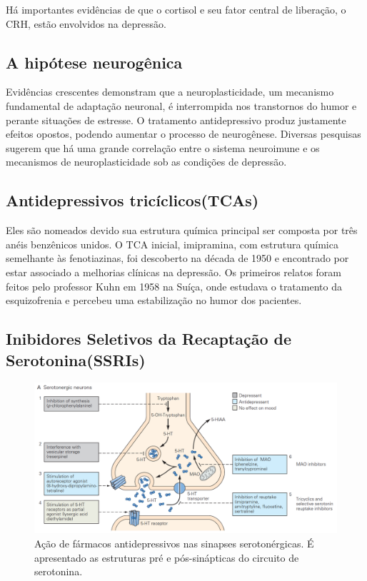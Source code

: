 Há importantes evidências de que o cortisol e seu fator central de liberação, o CRH, estão envolvidos na depressão.

\subsection{A hipótese neurogênica}

Evidências crescentes demonstram que a neuroplasticidade, um mecanismo fundamental de adaptação neuronal, é interrompida nos transtornos do humor e perante situações de estresse. O tratamento antidepressivo produz justamente efeitos opostos, podendo aumentar o processo de neurogênese. \cite{Pittenger2008} Diversas pesquisas sugerem que há uma grande correlação entre o sistema neuroimune e os mecanismos de neuroplasticidade sob as condições de depressão. \cite{Eyre2012}

\subsection{Antidepressivos tricíclicos(TCAs)}

Eles são nomeados devido sua estrutura química principal ser composta por três anéis benzênicos unidos. O TCA inicial, imipramina, com estrutura química semelhante às fenotiazinas, foi descoberto na década de 1950 e encontrado por estar associado a melhorias clínicas na depressão. Os primeiros relatos foram feitos pelo professor Kuhn em 1958 na Suíça, onde estudava o tratamento da esquizofrenia e percebeu uma estabilização no humor dos pacientes. \cite{Schatzberg2015}

\subsection{Inibidores Seletivos da Recaptação de Serotonina(SSRIs)}

\begin{figure}[H]
\centering
\includegraphics[scale=0.35]{Figuras/serotonergic_neurons.PNG}
\caption{Ação de fármacos antidepressivos nas sinapses serotonérgicas. É apresentado as estruturas pré e pós-sinápticas do circuito de serotonina. \cite{Kandel}}
\end{figure}

